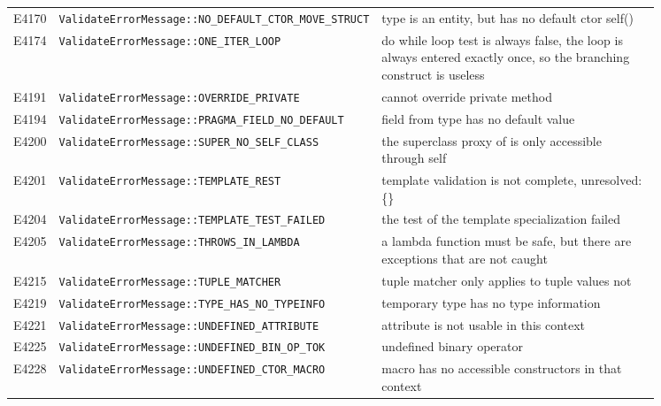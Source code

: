 \begin{longtable}{@{}l p{0.4\linewidth} p{0.45\linewidth}@{}}
E4170 & \texttt{ValidateErrorMessage::\allowbreak{}NO\_\allowbreak{}DEFAULT\_\allowbreak{}CTOR\_\allowbreak{}MOVE\_\allowbreak{}STRUCT} & type \errhole{} is an entity, but has no default ctor self()\\
E4174 & \texttt{ValidateErrorMessage::\allowbreak{}ONE\_\allowbreak{}ITER\_\allowbreak{}LOOP} & do while loop test is always false, the loop is always entered exactly once, so the branching construct is useless\\
E4191 & \texttt{ValidateErrorMessage::\allowbreak{}OVERRIDE\_\allowbreak{}PRIVATE} & cannot override private method \errhole{}\\
E4194 & \texttt{ValidateErrorMessage::\allowbreak{}PRAGMA\_\allowbreak{}FIELD\_\allowbreak{}NO\_\allowbreak{}DEFAULT} & field \errhole{} from type \errhole{} has no default value\\
E4200 & \texttt{ValidateErrorMessage::\allowbreak{}SUPER\_\allowbreak{}NO\_\allowbreak{}SELF\_\allowbreak{}CLASS} & the superclass proxy of \errhole{} is only accessible through self\\
E4201 & \texttt{ValidateErrorMessage::\allowbreak{}TEMPLATE\_\allowbreak{}REST} & template validation is not complete, unresolved: \{\errhole{}\}\\
E4204 & \texttt{ValidateErrorMessage::\allowbreak{}TEMPLATE\_\allowbreak{}TEST\_\allowbreak{}FAILED} & the test of the template specialization failed\\
E4205 & \texttt{ValidateErrorMessage::\allowbreak{}THROWS\_\allowbreak{}IN\_\allowbreak{}LAMBDA} & a lambda function must be safe, but there are exceptions that are not caught\\
E4215 & \texttt{ValidateErrorMessage::\allowbreak{}TUPLE\_\allowbreak{}MATCHER} & tuple matcher only applies to tuple values not \errhole{}\\
E4219 & \texttt{ValidateErrorMessage::\allowbreak{}TYPE\_\allowbreak{}HAS\_\allowbreak{}NO\_\allowbreak{}TYPEINFO} & temporary type \errhole{} has no type information\\
E4221 & \texttt{ValidateErrorMessage::\allowbreak{}UNDEFINED\_\allowbreak{}ATTRIBUTE} & attribute \errhole{} is not usable in this context\\
E4225 & \texttt{ValidateErrorMessage::\allowbreak{}UNDEFINED\_\allowbreak{}BIN\_\allowbreak{}OP\_\allowbreak{}TOK} & undefined binary operator \errhole{}\\
E4228 & \texttt{ValidateErrorMessage::\allowbreak{}UNDEFINED\_\allowbreak{}CTOR\_\allowbreak{}MACRO} & macro \errhole{} has no accessible constructors in that context\\

\end{longtable}
